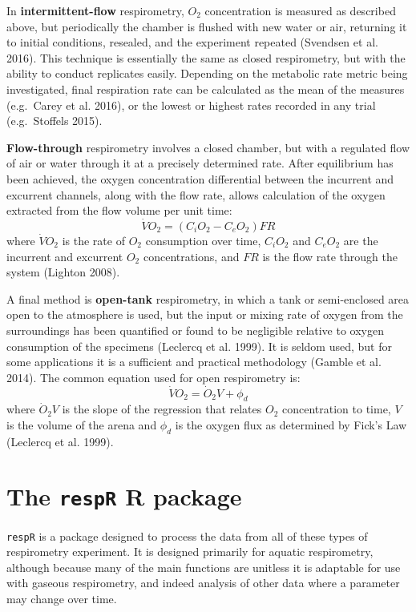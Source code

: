\documentclass[]{book}
\begin{document}
In \textbf{intermittent-flow} respirometry, \(O_2\) concentration is
measured as described above, but periodically the chamber is flushed
with new water or air, returning it to initial conditions, resealed, and
the experiment repeated (Svendsen et al. 2016). This technique is
essentially the same as closed respirometry, but with the ability to
conduct replicates easily. Depending on the metabolic rate metric being
investigated, final respiration rate can be calculated as the mean of
the measures (e.g.~Carey et al. 2016), or the lowest or highest rates
recorded in any trial (e.g.~Stoffels 2015).

\textbf{Flow-through} respirometry involves a closed chamber, but with a
regulated flow of air or water through it at a precisely determined
rate. After equilibrium has been achieved, the oxygen concentration
differential between the incurrent and excurrent channels, along with
the flow rate, allows calculation of the oxygen extracted from the flow
volume per unit time: \[\dot{V}O_2 = (C_iO_2 - C_eO_2)FR\] where
\(\dot{V}O_2\) is the rate of \(O_2\) consumption over time, \(C_iO_2\)
and \(C_eO_2\) are the incurrent and excurrent \(O_2\) concentrations,
and \(FR\) is the flow rate through the system (Lighton 2008).

A final method is \textbf{open-tank} respirometry, in which a tank or
semi-enclosed area open to the atmosphere is used, but the input or
mixing rate of oxygen from the surroundings has been quantified or found
to be negligible relative to oxygen consumption of the specimens
(Leclercq et al. 1999). It is seldom used, but for some applications it
is a sufficient and practical methodology (Gamble et al. 2014). The
common equation used for open respirometry is:
\[\dot{V}O_2 = \dot O_2V + \phi_d\] where \(\dot O_2V\) is the slope of
the regression that relates \(O_2\) concentration to time, \(V\) is the
volume of the arena and \(\phi_d\) is the oxygen flux as determined by
Fick's Law (Leclercq et al. 1999).

\section{\texorpdfstring{The \texttt{respR} R
package}{The respR R package}}\label{the-respr-r-package}

\texttt{respR} is a package designed to process the data from all of
these types of respirometry experiment. It is designed primarily for
aquatic respirometry, although because many of the main functions are
unitless it is adaptable for use with gaseous respirometry, and indeed
analysis of other data where a parameter may change over time.
\end{document}

